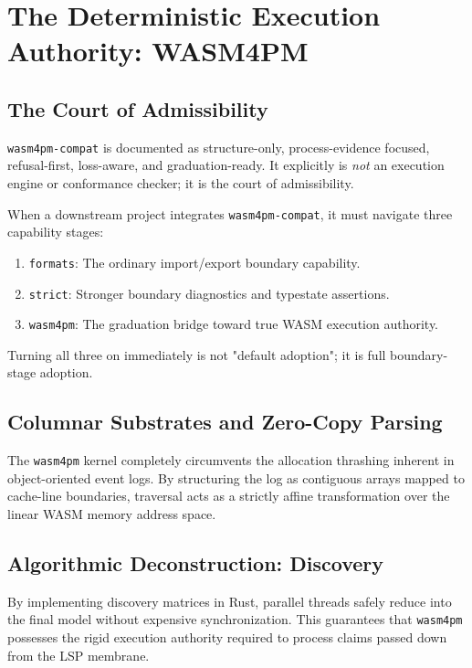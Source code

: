
\chapter{The Deterministic Execution Authority: WASM4PM}
\section{The Court of Admissibility}
\texttt{wasm4pm-compat} is documented as structure-only, process-evidence focused, refusal-first, loss-aware, and graduation-ready. It explicitly is \textit{not} an execution engine or conformance checker; it is the court of admissibility. 

When a downstream project integrates \texttt{wasm4pm-compat}, it must navigate three capability stages:
\begin{enumerate}
    \item \texttt{formats}: The ordinary import/export boundary capability.
    \item \texttt{strict}: Stronger boundary diagnostics and typestate assertions.
    \item \texttt{wasm4pm}: The graduation bridge toward true WASM execution authority.
\end{enumerate}

Turning all three on immediately is not "default adoption"; it is full boundary-stage adoption.

\section{Columnar Substrates and Zero-Copy Parsing}
The \texttt{wasm4pm} kernel completely circumvents the allocation thrashing inherent in object-oriented event logs. By structuring the log as contiguous arrays mapped to cache-line boundaries, traversal acts as a strictly affine transformation over the linear WASM memory address space.

\section{Algorithmic Deconstruction: Discovery}
By implementing discovery matrices in Rust, parallel threads safely reduce into the final model without expensive synchronization. This guarantees that \texttt{wasm4pm} possesses the rigid execution authority required to process claims passed down from the LSP membrane.

